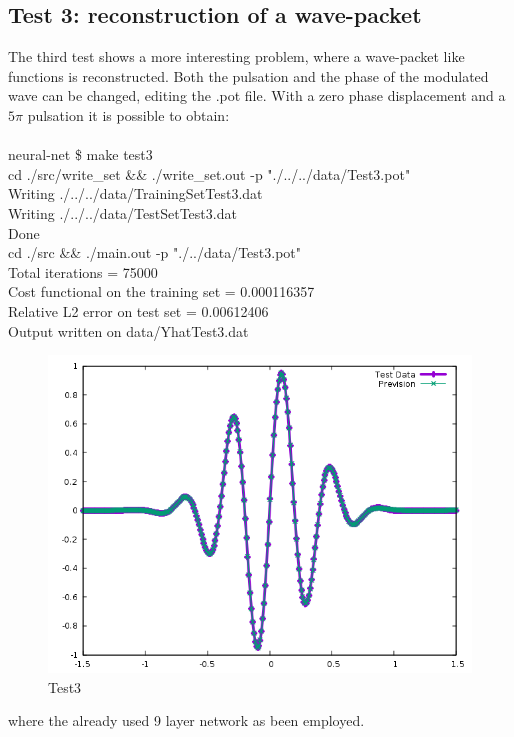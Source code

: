 \documentclass[12pt, a4paper]{report}
\theoremstyle{definition}
\begin{document}
\subsection{Test 3: reconstruction of a wave-packet}
The third test shows a more interesting problem, where a wave-packet like functions is reconstructed. Both the pulsation and the phase of the modulated wave can be changed, editing the .pot file. With a zero phase displacement and a $5\pi$ pulsation it is possible to obtain:\\
{\\\ttfamily neural-net \$ make test3\\
	cd ./src/write\_set \&\& ./write\_set.out -p "./../../data/Test3.pot"\\
	Writing ./../../data/TrainingSetTest3.dat\\
	Writing ./../../data/TestSetTest3.dat\\
	Done\\
	cd ./src \&\& ./main.out -p "./../data/Test3.pot"\\
	Total iterations = 75000\\
	Cost functional on the training set = 0.000116357\\
	Relative L2 error on test set = 0.00612406\\
	Output written on data/YhatTest3.dat\\
}
\begin{figure}[H]
	\centering
	\includegraphics[width=\textwidth]{img/Test3} 
	\caption{Test3}\label{fig:test3}
\end{figure}
\noindent where the already used 9 layer network as been employed.
\end{document}
